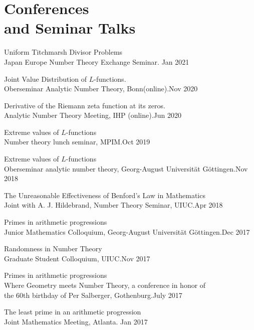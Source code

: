 \documentclass[margin,line,pifont,palatino,courier]{res}
\newenvironment{list1}{
  \begin{list}{\ding{113}}{%
      \setlength{\itemsep}{0in}
      \setlength{\parsep}{0in} \setlength{\parskip}{0in}
      \setlength{\topsep}{0in} \setlength{\partopsep}{0in}
      \setlength{\leftmargin}{0.17in}}}{\end{list}}
\begin{document}
\begin{resume}
\begin{list1}
\end{list1}

\section{\sc Conferences\\ and Seminar Talks}
\begin{list1}
\item{Uniform Titchmarsh Divisor Problems} \\{Japan Europe Number Theory Exchange Seminar}. {\hfill Jan 2021}
\item{ Joint Value Distribution of $L$-functions.} \\{Oberseminar Analytic Number Theory, Bonn(online)}.{\hfill Nov 2020}
\item{ Derivative of the Riemann zeta function at its zeros.} \\{Analytic Number Theory Meeting, IHP (online)}.{\hfill Jun 2020}

\item{Extreme values of $L$-functions} \\{ Number theory lunch seminar, MPIM}.{\hfill Oct 2019}

\item{Extreme values of $L$-functions} \\{Oberseminar analytic number theory, Georg-August Universit\"at G\"ottingen}.{\hfill Nov 2018}
 
 \item{The Unreasonable Effectiveness of Benford's Law in Mathematics}\\Joint with A. J. Hildebrand, Number Theory Seminar, UIUC.{\hfill Apr 2018}
 
\item{Primes in arithmetic progressions} \\{Junior Mathematics Colloquium, Georg-August Universit\"at G\"ottingen}.{\hfill Dec 2017}

\item{Randomness in Number Theory} \\{Graduate Student Colloquium, UIUC}.{\hfill Nov 2017}


\item{Primes in arithmetic progressions} \\{Where Geometry meets Number Theory, a conference in honor of \\the 60th birthday of Per Salberger, Gothenburg}.{\hfill July 2017}
	
 	\item{The least prime in an arithmetic progression} \\
	Joint Mathematics Meeting, Atlanta. {\hfill Jan 2017}


\end{list1}
\end{resume}
\end{document}
